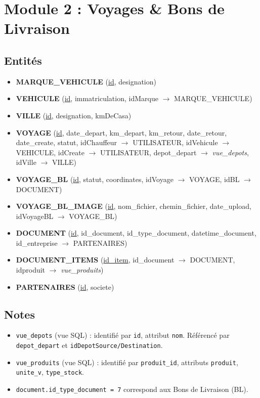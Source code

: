 \documentclass[12pt,a4paper]{article}
\begin{document}
\newpage

\section{Module 2 : Voyages \& Bons de Livraison}

\subsection{Entités}

\begin{itemize}[leftmargin=1.5em]
\item \textbf{MARQUE\_VEHICULE} (\underline{id}, designation)
\item \textbf{VEHICULE} (\underline{id}, immatriculation, idMarque $\rightarrow$ MARQUE\_VEHICULE)
\item \textbf{VILLE} (\underline{id}, designation, kmDeCasa)
\item \textbf{VOYAGE} (\underline{id}, date\_depart, km\_depart, km\_retour, date\_retour, date\_create, statut, idChauffeur $\rightarrow$ UTILISATEUR, idVehicule $\rightarrow$ VEHICULE, idCreate $\rightarrow$ UTILISATEUR, depot\_depart $\rightarrow$ \textit{vue\_depots}, idVille $\rightarrow$ VILLE)
\item \textbf{VOYAGE\_BL} (\underline{id}, statut, coordinates, idVoyage $\rightarrow$ VOYAGE, idBL $\rightarrow$ DOCUMENT)
\item \textbf{VOYAGE\_BL\_IMAGE} (\underline{id}, nom\_fichier, chemin\_fichier, date\_upload, idVoyageBL $\rightarrow$ VOYAGE\_BL)
\item \textbf{DOCUMENT} (\underline{id}, id\_document, id\_type\_document, datetime\_document, id\_entreprise $\rightarrow$ PARTENAIRES)
\item \textbf{DOCUMENT\_ITEMS} (\underline{id\_item}, id\_document $\rightarrow$ DOCUMENT, idproduit $\rightarrow$ \textit{vue\_produits})
\item \textbf{PARTENAIRES} (\underline{id}, societe)
\end{itemize}

\subsection{Notes}
\begin{itemize}[leftmargin=1.5em]
\item \texttt{vue\_depots} (vue SQL) : identifié par \texttt{id}, attribut \texttt{nom}. Référencé par \texttt{depot\_depart} et \texttt{idDepotSource/Destination}.
\item \texttt{vue\_produits} (vue SQL) : identifié par \texttt{produit\_id}, attributs \texttt{produit}, \texttt{unite\_v}, \texttt{type\_stock}.
\item \texttt{document.id\_type\_document = 7} correspond aux Bons de Livraison (BL).
\end{itemize}
\end{document}
